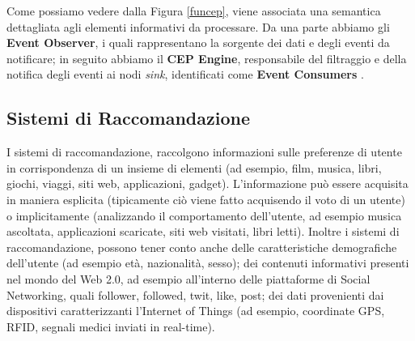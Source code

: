 \documentclass[11pt]{article}
\begin{document}
Come possiamo vedere dalla Figura \ref{funcep}, viene associata una semantica dettagliata agli elementi informativi da processare. Da una parte abbiamo gli \textbf{Event Observer}, i quali rappresentano la sorgente dei dati e degli eventi da notificare; in seguito abbiamo il \textbf{CEP Engine}, responsabile del filtraggio e della notifica degli eventi ai nodi \textit{sink}, identificati come \textbf{Event Consumers} \cite{Cugola:2012:PFI:2187671.2187677,fulop2010survey}.

\subsection{Sistemi di Raccomandazione}
I sistemi di raccomandazione, raccolgono informazioni sulle preferenze di utente in corrispondenza di un insieme di elementi (ad esempio, film, musica, libri, giochi, viaggi, siti web, applicazioni, gadget). L'informazione può essere acquisita in maniera esplicita (tipicamente ciò viene fatto acquisendo il voto di un utente) o implicitamente (analizzando il comportamento dell'utente, ad esempio musica ascoltata, applicazioni scaricate, siti web visitati, libri letti). Inoltre i sistemi di raccomandazione, possono tener conto anche delle caratteristiche demografiche dell'utente (ad esempio età, nazionalità, sesso); dei contenuti informativi presenti nel mondo del Web 2.0, ad esempio all'interno delle piattaforme di Social Networking, quali follower, followed, twit, like, post; dei dati provenienti dai dispositivi caratterizzanti l'Internet of Things (ad esempio, coordinate GPS, RFID, segnali medici inviati in real-time). 
\end{document}
